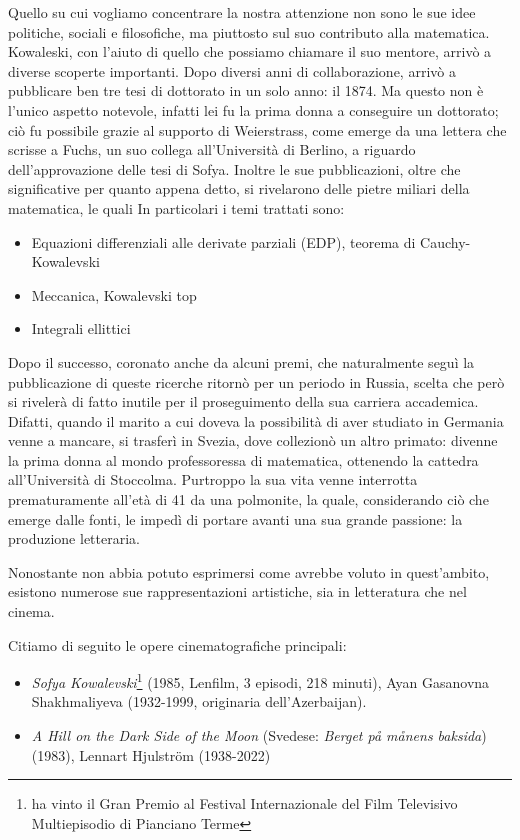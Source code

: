 Quello su cui vogliamo concentrare la nostra attenzione non sono le sue idee politiche, sociali e filosofiche, ma piuttosto sul suo contributo alla matematica. Kowaleski, con l'aiuto di quello che possiamo chiamare il suo mentore, arrivò a diverse scoperte importanti. Dopo diversi anni di collaborazione, arrivò a pubblicare ben tre tesi di dottorato in un solo anno: il 1874. Ma questo non è l'unico aspetto notevole, infatti lei fu la prima donna a conseguire un dottorato; ciò fu possibile grazie al supporto di Weierstrass, come emerge da una lettera che scrisse a Fuchs, un suo collega all'Università di Berlino, a riguardo dell'approvazione delle tesi di Sofya. Inoltre le sue pubblicazioni, oltre che significative per quanto appena detto, si rivelarono delle pietre miliari della matematica, le quali 
In particolari i temi trattati sono:
\begin{itemize}
\item Equazioni differenziali alle derivate parziali (EDP), teorema di Cauchy-Kowalevski
\item Meccanica, Kowalevski top
\item Integrali ellittici
\end{itemize}


Dopo il successo, coronato anche da alcuni premi, che naturalmente seguì la pubblicazione di queste ricerche ritornò per un periodo in Russia, scelta che però si rivelerà di fatto inutile per il proseguimento della sua carriera accademica. Difatti, quando il marito a cui doveva la possibilità di aver studiato in Germania venne a mancare, si trasferì in Svezia, dove collezionò un altro primato: divenne la prima donna al mondo professoressa di matematica, ottenendo la cattedra all'Università di Stoccolma.
Purtroppo la sua vita venne interrotta prematuramente all'età di 41 da una polmonite, la quale, considerando ciò che emerge dalle fonti, le impedì di portare avanti una sua grande passione: la produzione letteraria.

Nonostante non abbia potuto esprimersi come avrebbe voluto in quest'ambito, esistono numerose sue rappresentazioni artistiche, sia in letteratura che nel cinema.

Citiamo di seguito le opere cinematografiche principali:
\begin{itemize}
\emergencystretch 3em
\item \textit{Sofya Kowalevski}\footnote{ ha vinto il Gran Premio al Festival Internazionale del Film Televisivo Multiepisodio di Pianciano Terme} (1985, Lenfilm, 3 episodi, 218 minuti), Ayan Gasanovna Shakhmaliyeva (1932-1999,
originaria dell'Azerbaijan).

\item \textit{A Hill on the Dark Side of the Moon} (Svedese: \textit{Berget på månens baksida})(1983), Lennart Hjulström (1938-2022)
\end{itemize}

